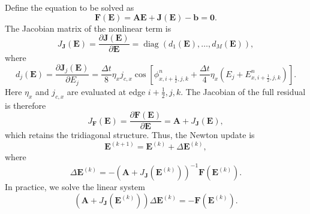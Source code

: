 \documentclass{article}
\numberwithin{figure}{section}
\begin{document}
Define the equation to be solved as
\begin{equation}\label{eq:josephson-residual}
    \mathbf{F}(\mathbf{E})=\mathbf{A}\mathbf{E}+\mathbf{J}(\mathbf{E})-\mathbf{b}=\mathbf{0}.
\end{equation}
The Jacobian matrix of the nonlinear term is
\begin{equation}\label{eq:josephson-current-jacobian}
    J_{\mathbf{J}}(\mathbf{E}) = \frac{\partial \mathbf{J}(\mathbf{E})}{\partial \mathbf{E}} = \operatorname{diag}\!\left(d_1(\mathbf{E}),\ldots,d_M(\mathbf{E})\right),
\end{equation}
where
\begin{equation}\label{eq:josephson-current-jacobian-diagonal}
    d_j(\mathbf{E})= \frac{\partial \mathbf{J}_j(\mathbf{E})}{\partial E_j} = \frac{\Delta t}{8}\eta_x j_{c,x}\cos\!\left[\phi_{x,i+\tfrac12,j,k}^{n}+\frac{\Delta t}{4}\eta_x\left(E_j+E_{x,i+\tfrac12,j,k}^{n}\right)\right].
\end{equation}
Here \(\eta_x\) and \(j_{c,x}\) are evaluated at edge \(i+\tfrac12,j,k\). The Jacobian of the full residual is therefore
\begin{equation}\label{eq:josephson-residual-jacobian}
    J_{\mathbf{F}}(\mathbf{E})=\frac{\partial\mathbf{F}(\mathbf{E})}{\partial\mathbf{E}}=\mathbf{A}+J_{\mathbf{J}}(\mathbf{E}),
\end{equation}
which retains the tridiagonal structure. Thus, the Newton update is
\begin{equation}
    \mathbf{E}^{(k+1)} = \mathbf{E}^{(k)} + \Delta\mathbf{E}^{(k)},
\end{equation}
where
\begin{equation}
    \Delta\mathbf{E}^{(k)} = -\left(\mathbf{A}+J_{\mathbf{J}}(\mathbf{E}^{(k)})\right)^{-1}\mathbf{F}(\mathbf{E}^{(k)}).
\end{equation}
In practice, we solve the linear system
\begin{equation}
    \left(\mathbf{A}+J_{\mathbf{J}}(\mathbf{E}^{(k)})\right)\Delta\mathbf{E}^{(k)} = -\mathbf{F}(\mathbf{E}^{(k)}).
\end{equation}
\end{document}
